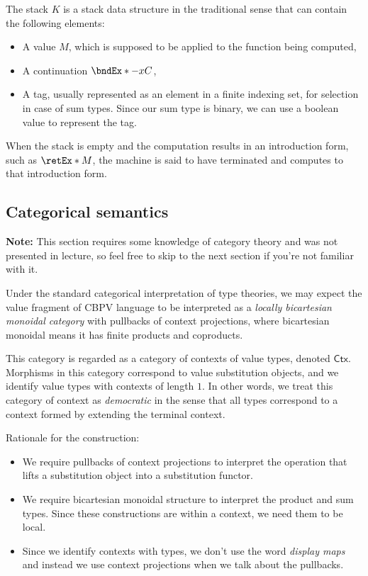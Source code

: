 \documentclass[letterpaper]{article}
\begin{document}
The stack $K$ is a stack data structure in the traditional sense that can contain the following elements:
\begin{itemize}
  \item A value $M$, which is supposed to be applied to the function being computed,
  \item A continuation $\bndEx*{-}{x}{C}$,
  \item A tag, usually represented as an element in a finite indexing set, for selection in case of sum types.
        Since our sum type is binary, we can use a boolean value to represent the tag.
\end{itemize}
When the stack is empty and the computation results in an introduction form, such as $\retEx* M$,
the machine is said to have terminated and computes to that introduction form.

\subsection{Categorical semantics}
\newcommand{\Ctx}{\mathsf{Ctx}}
\newcommand{\Stk}{\mathsf{Stk}}

{\bf Note:} This section requires some knowledge of category theory and was not presented in lecture, so feel free to skip to the next section if you're not familiar with it.

Under the standard categorical interpretation of type theories,
we may expect the value fragment of CBPV language to be interpreted as a
\emph{locally bicartesian monoidal category} with pullbacks of context projections,
where bicartesian monoidal means it has finite products and coproducts.

This category is regarded as a category of contexts of value types, denoted $\Ctx$.
Morphisms in this category correspond to value substitution objects,
and we identify value types with contexts of length $1$.
In other words, we treat this category of context as \emph{democratic}
in the sense that all types correspond to a context formed by extending the terminal context.

Rationale for the construction:
\begin{itemize}
  \item We require pullbacks of context projections to interpret the operation that lifts a substitution object into a substitution functor.
  \item We require bicartesian monoidal structure to interpret the product and sum types.
        Since these constructions are within a context, we need them to be local.
  \item Since we identify contexts with types, we don't use the word \emph{display maps}
        and instead we use context projections when we talk about the pullbacks.
\end{itemize}
\end{document}
